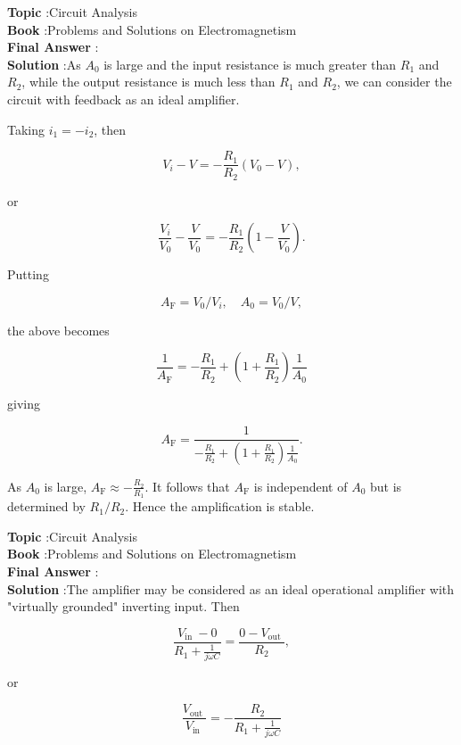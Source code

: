 \documentclass[10pt]{article}
\begin{document}
\textbf{Topic} :Circuit Analysis\\
\textbf{Book} :Problems and Solutions on Electromagnetism\\
\textbf{Final Answer} :\\


\textbf{Solution} :As $A_{0}$ is large and the input resistance is much greater than $R_{1}$ and $R_{2}$, while the output resistance is much less than $R_{1}$ and $R_{2}$, we can consider the circuit with feedback as an ideal amplifier.

Taking $i_{1}=-i_{2}$, then

$$
V_{i}-V=-\frac{R_{1}}{R_{2}}\left(V_{0}-V\right),
$$

or

$$
\frac{V_{i}}{V_{0}}-\frac{V}{V_{0}}=-\frac{R_{1}}{R_{2}}\left(1-\frac{V}{V_{0}}\right) .
$$



Putting

$$
A_{\mathrm{F}}=V_{0} / V_{i}, \quad A_{0}=V_{0} / V,
$$

the above becomes

$$
\frac{1}{A_{\mathrm{F}}}=-\frac{R_{1}}{R_{2}}+\left(1+\frac{R_{1}}{R_{2}}\right) \frac{1}{A_{0}}
$$

giving

$$
A_{\mathrm{F}}=\frac{1}{-\frac{R_{1}}{R_{2}}+\left(1+\frac{R_{1}}{R_{2}}\right) \frac{1}{A_{0}}} .
$$

As $A_{0}$ is large, $A_{\mathrm{F}} \approx-\frac{R_{2}}{R_{1}}$. It follows that $A_{\mathrm{F}}$ is independent of $A_{0}$ but is determined by $R_{1} / R_{2}$. Hence the amplification is stable.

\textbf{Topic} :Circuit Analysis\\
\textbf{Book} :Problems and Solutions on Electromagnetism\\
\textbf{Final Answer} :\\


\textbf{Solution} :The amplifier may be considered as an ideal operational amplifier with "virtually grounded" inverting input. Then

$$
\frac{V_{\text {in }}-0}{R_{1}+\frac{1}{j \omega C}}=\frac{0-V_{\text {out }}}{R_{2}},
$$

or

$$
\frac{V_{\text {out }}}{V_{\text {in }}}=-\frac{R_{2}}{R_{1}+\frac{1}{j \omega C}}
$$
\end{document}
